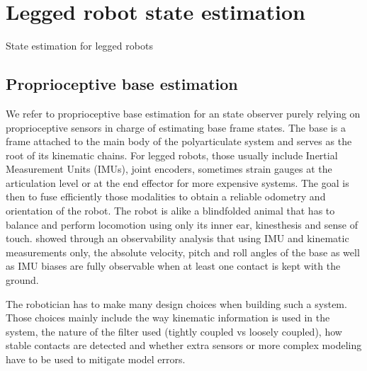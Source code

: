 \chapter{Legged robot state estimation}
State estimation for legged robots 


\section{Proprioceptive base estimation}
We refer to proprioceptive base estimation for an state observer purely relying on proprioceptive sensors in charge of 
estimating base frame states. The base is a frame attached to the main body of the polyarticulate system and serves
as the root of its kinematic chains. For legged robots, those usually include Inertial Measurement Units (IMUs), joint encoders, sometimes strain gauges at the 
articulation level or at the end effector for more expensive systems. The goal is then to fuse efficiently those 
modalities to obtain a reliable odometry and orientation of the robot. The robot is alike a blindfolded animal that has to balance and perform locomotion using 
only its inner ear, kinesthesis and sense of touch. \cite{bloesch2013state,rotella2014state} showed through an observability analysis that using IMU and kinematic measurements 
only, the absolute velocity, pitch and roll angles of the base as well as IMU biases are fully observable when at least one contact 
is kept with the ground.

The robotician has to make many design choices when building such a system. Those choices mainly include the way kinematic information is used in the system, 
the nature of the filter used (tightly coupled vs loosely coupled), how stable contacts are detected and whether extra sensors or more complex modeling have 
to be used to mitigate model errors.
 

